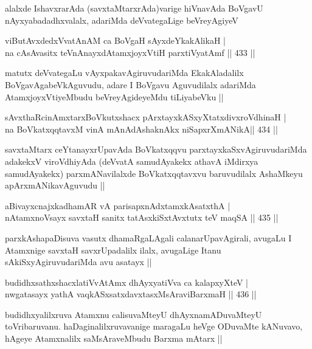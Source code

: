 \begin{artha}
alalxde IshavxrarAda (savxtaMtarxrAda)varige hiVnavAda BoVgavU nAyxyabadadhxvalalx, adariMda deVvategaLige beVreyAgiyeV 
\end{artha}

\begin{shl}
viButAvxdedxVvatAnAM ca BoVgaH sAyxdeYkakAlikaH | \\
na cAsAvasitx teVnAnayxdAtamxjoyxVtiH parxtiVyatAmf \hfill||  433 ||  
\end{shl}

\begin{artha}
matutx deVvategaLu vAyxpakavAgiruvudariMda EkakAladalilx BoVgavAgabeVkAguvudu, adare I BoVgavu Aguvudilalx adariMda AtamxjoyxVtiyeMbudu beVreyAgideyeMdu tiLiyabeVku ||
\end{artha}

\begin{shl}
sAvxthaRcinAmxtarxBoVkutxshacx pArxtayxkASxyXtatxdivxroVdhinaH | \\
na BoVkatxqqtavxM vinA mAnAdAshaknAkx niSapxrXmANikA\hfill ||  434 ||  
\end{shl}

\begin{artha}
savxtaMtarx ceYtanayxrUpavAda BoVkatxqqvu parxtayxkaSxvAgiruvudariMda adakekxV viroVdhiyAda (deVvatA samudAyakekx athavA iMdirxya samudAyakekx) parxmANavilalxde BoVkatxqqtavxvu baruvudilalx AshaMkeyu apArxmANikavAguvudu ||
\end{artha}

\begin{shl}
aBivayxcnajxkadhamAR vA parisapxnAdxtamxkAsatxthA | \\
nA\s \s tamxnoV\s sayx savxtaH sanitx tatAsxkiSxtAvxtutx teV maqSA \hfill||  435 ||  
\end{shl}

\begin{artha}
parxkAshapaDisuva vasutx dhamaRgaLAgali calanarUpavAgirali, avugaLu I Atamxnige savxtaH savxrUpadalilx ilalx, avugaLige Itanu sAkiSxyAgiruvudariMda avu asatayx ||
\end{artha}

\begin{shl}
budidhxsathxshacxlatiVvA\s \s tAmx dhAyxyatiVva ca kalapxyXteV | \\
nwgatasayx yathA vaqkASxsatxdavxtasxMsAraviBarxmaH \hfill||  436 ||  
\end{shl}

\begin{artha}
budidhxyalilxruva Atamxnu calisuvaMteyU dhAyxnamADuvaMteyU toVribaruvanu. haDaginalilxruvavanige maragaLu heVge ODuvaMte kANuvavo, hAgeye Atamxnalilx saMsAraveMbudu Barxma mAtarx ||
\end{artha}

